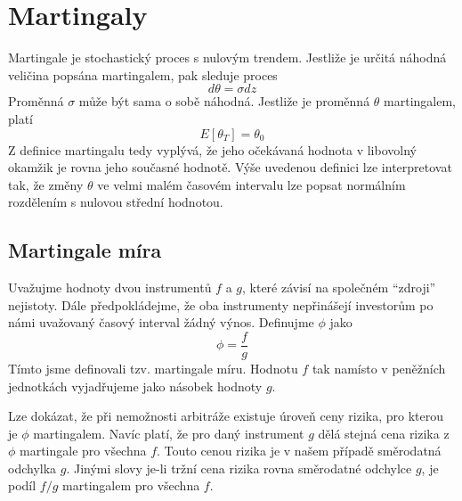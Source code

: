 \documentclass[a4paper]{book}
\begin{document}
\section{Martingaly}

Martingale je stochastický proces s nulovým trendem. Jestliže je určitá náhodná veličina popsána martingalem, pak sleduje proces
\begin{equation*}
d \theta = \sigma dz
\end{equation*}
Proměnná $\sigma$ může být sama o sobě náhodná. Jestliže je proměnná $\theta$ martingalem, platí 
\begin{equation*}
E[\theta_T]=\theta_0
\end{equation*}
Z definice martingalu tedy vyplývá, že jeho očekávaná hodnota v libovolný okamžik je rovna jeho současné hodnotě. Výše uvedenou definici lze interpretovat tak, že změny $\theta$ ve velmi malém časovém intervalu lze popsat normálním rozdělením s nulovou střední hodnotou.

\subsection{Martingale míra}

Uvažujme hodnoty dvou instrumentů $f$ a $g$, které závisí na společném ``zdroji'' nejistoty. Dále předpokládejme, že oba instrumenty nepřinášejí investorům po námi uvažovaný časový interval žádný výnos. Definujme $\phi$ jako
\begin{equation*}
\phi = \frac{f}{g}
\end{equation*}
Tímto jsme definovali tzv. martingale míru. Hodnotu $f$ tak namísto v peněžních jednotkách vyjadřujeme jako násobek hodnoty $g$.

Lze dokázat, že při nemožnosti arbitráže existuje úroveň ceny rizika, pro kterou je $\phi$ martingalem. Navíc platí, že pro daný instrument $g$ dělá stejná cena rizika z $\phi$ martingale pro všechna $f$. Touto cenou rizika je v našem případě směrodatná odchylka $g$. Jinými slovy je-li tržní cena rizika rovna směrodatné odchylce $g$, je podíl $f/g$ martingalem pro všechna $f$.
\end{document}
